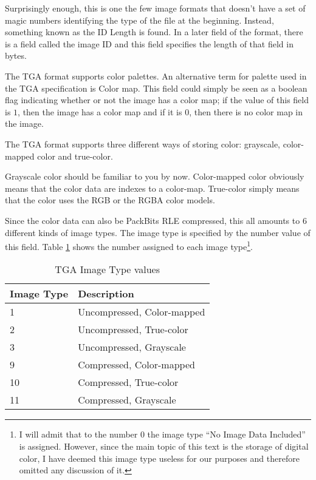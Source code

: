 Surprisingly enough, this is one the few image formats that doesn't
have a set of magic numbers identifying the type of the file at the
beginning. Instead, something known as the ID Length is found. In a
later field of the format, there is a field called the image ID and
this field specifies the length of that field in bytes.


The TGA format supports color palettes. An alternative term for
palette used in the TGA specification is Color map. This field could simply be seen as a boolean flag indicating
whether or not the image has a color map; if the value of this field
is $1$, then the image has a color map and if it is $0$, then there is
no color map in the image.


The TGA format supports three different ways of storing color:
grayscale, color-mapped color and
true-color.

Grayscale color should be familiar to you by now. Color-mapped color
obviously means that the color data are indexes to a
color-map. True-color simply means that the color uses the RGB or the
RGBA color models.


Since the color data can also be PackBits RLE compressed, this all amounts to $6$
different kinds of image types. The image type is specified by the
number value of this field. Table \ref{tab:imgtype} shows the number
assigned to each image type\footnote{I will admit that to the number
  $0$ the image type ``No Image Data Included'' is assigned. However,
  since the main topic of this text is the storage of digital color, I
have deemed this image type useless for our purposes and therefore
omitted any discussion of it.}.

\begin{table}
  \centering
  \begin{tabular}{ll}
    \toprule
    Image Type & Description \\
    \midrule
    1 & Uncompressed, Color-mapped \\
    2 & Uncompressed, True-color \\
    3 & Uncompressed, Grayscale\\
    9 & Compressed, Color-mapped \\
    10 & Compressed, True-color \\
    11 & Compressed, Grayscale\\
    \bottomrule
  \end{tabular}
  \caption{TGA Image Type values}
  \label{tab:imgtype}
\end{table}

